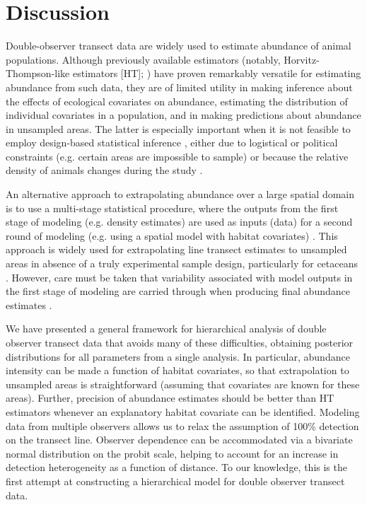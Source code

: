 \documentclass[10pt]{article}
\begin{document}
\section*{Discussion}

Double-observer transect data are widely used to estimate abundance of animal populations. Although previously available estimators (notably, Horvitz-Thompson-like estimators [HT]; \cite{BorchersEtAl2002}) have proven remarkably versatile for estimating abundance from such data, they are of limited utility in making inference about the effects of ecological covariates on abundance, estimating the distribution of individual covariates in a population, and in making predictions about abundance in unsampled areas.
The latter is especially important when it is not feasible to employ design-based statistical inference \cite{Cochran1977}, either due to logistical or political constraints (e.g. certain areas are impossible to sample) or because the relative density of animals changes during the study \cite{VerHoefEtAl2011}.

An alternative approach to extrapolating abundance over a large spatial domain is to use a multi-stage statistical procedure, where the outputs from the first stage of modeling (e.g. density estimates) are used as inputs (data) for a second round of modeling (e.g. using a spatial model with habitat covariates) \cite{Forney2000,HedleyBuckland2004}.  This approach is widely used for extrapolating line transect estimates to unsampled areas in absence of a truly experimental sample design, particularly for cetaceans \cite{RedfernEtAl2006,BeckerEtAl2010}.  However, care must be taken that variability associated with model outputs in the first stage of modeling are carried through when producing final abundance estimates \cite{VerHoefEtAl2011}.

We have presented a general framework for hierarchical analysis of double observer transect data that avoids many of these difficulties, obtaining posterior distributions for all parameters from a single analysis.  In particular, abundance intensity can be made a function of habitat covariates, so that extrapolation to unsampled areas is straightforward (assuming that covariates are known for these areas).  Further, precision of abundance estimates should be better than HT estimators whenever an explanatory habitat covariate can be identified.  Modeling data from multiple observers allows us to relax the assumption of 100\% detection on the transect line.  Observer dependence can be accommodated via a bivariate normal distribution on the probit scale, helping to account for an increase in detection heterogeneity as a function of distance.  To our knowledge, this is the first attempt at constructing a hierarchical model for double observer transect data.
\end{document}
